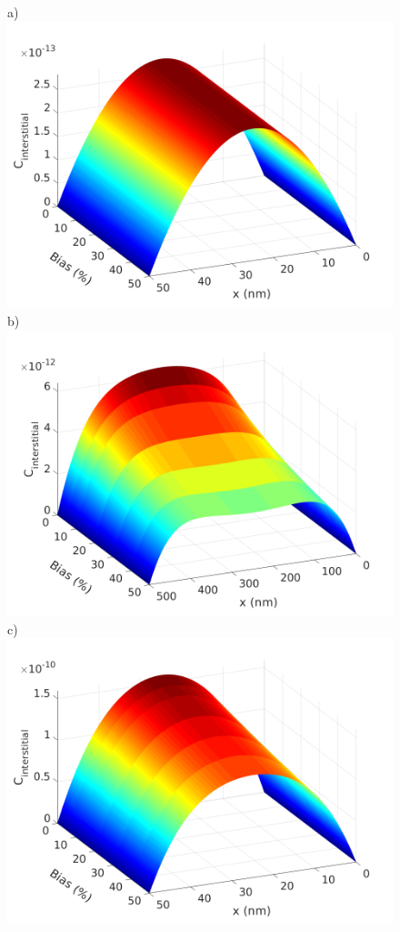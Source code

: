 \documentclass[utf8]{frontiersSCNS} %
\begin{document}
    \begin{figure}[htb!]  %
        \centering
        a)\includegraphics[scale=0.33]{data_neutron_50nm}
        b)\includegraphics[scale=0.33]{data_neutron_500nm}
        c)\includegraphics[scale=0.33]{data_high_neutron_50nm}

\end{figure}
\end{document}
